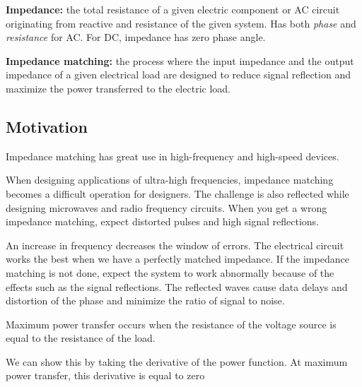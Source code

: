 \begin{pline}
    \item \textbf{Impedance:} the total resistance of a given electric component or AC circuit originating from reactive and resistance of the given system. Has both \textit{phase} and \textit{resistance} for AC. For DC, impedance has zero phase angle.
    \item \textbf{Impedance matching:} the process where the input impedance and the output impedance of a given electrical load are designed to reduce signal reflection and maximize the power transferred to the electric load.
\end{pline}

\subsection{Motivation}
Impedance matching has great use in high-frequency and high-speed devices. 

When designing applications of ultra-high frequencies, impedance matching becomes a difficult operation for designers. The challenge is also reflected while designing microwaves and radio frequency circuits. When you get a wrong impedance matching, expect distorted pulses and high signal reflections.

An increase in frequency decreases the window of errors. The electrical circuit works the best when we have a perfectly matched impedance. If the impedance matching is not done, expect the system to work abnormally because of the effects such as the signal reflections. The reflected waves cause data delays and distortion of the phase and minimize the ratio of signal to noise.

\begin{pline}
    \item Maximum power transfer occurs when the resistance of the voltage source is equal to the resistance of the load.
\end{pline}

We can show this by taking the derivative of the power function. At maximum power transfer, this derivative is equal to zero
